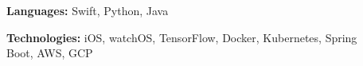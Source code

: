 
\begin{description}
    \item[]{\bf Languages:}
    { \footnotesize 
    Swift, Python, Java
    }
    \item[]{\bf Technologies:}
    { \footnotesize 
    iOS, watchOS, TensorFlow, Docker, Kubernetes, Spring Boot, AWS, GCP
    }
\end{description}